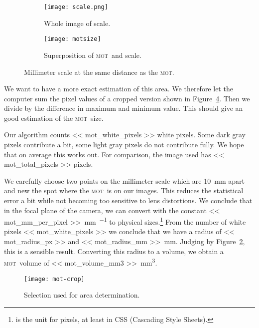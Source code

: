 \documentclass[11pt, english, fleqn, DIV=15, headinclude, BCOR=2cm]{scrreprt}
\newcommand\mot{\textsc{mot}}
\begin{document}
\begin{figure}
    \begin{subfigure}{.45\textwidth}
        \centering
        \texttt{[image: scale.png]}
        \caption{Whole image of scale.}
        \label{fig:scale}
    \end{subfigure}
    \hfill
    \begin{subfigure}{.45\textwidth}
        \centering
        \texttt{[image: motsize]}
        \caption{Superposition of \mot\ and scale.}
        \label{fig:motsize}
    \end{subfigure}
    \caption{Millimeter scale at the same distance as the \mot.}
    \label{fig:mot_size}
\end{figure}

We want to have a more exact estimation of this area. We therefore let the
computer sum the pixel values of a cropped version shown in
Figure~\ref{fig:mot-crop}. Then we divide by the difference in maximum and
minimum value. This should give an good estimation of the \mot\ size.

Our algorithm counts \num{<< mot_white_pixels >>} white pixels. Some dark gray
pixels contribute a bit, some light gray pixels do not contribute fully. We
hope that on average this works out. For comparison, the image used has \num{<<
mot_total_pixels >>} pixels.

We carefully choose two points on the millimeter scale which are
\SI{10}{\milli\meter} apart and new the spot where the \mot\ is on our images.
This reduces the statistical error a bit while not becoming too sensitive to
lens distortions. We conclude that in the focal plane of the camera, we can
convert with the constant \SI{<< mot_mm_per_pixel >>}{\milli\meter\per\pixel}
to physical sizes.\footnote{\si{\pixel} is the unit for pixels, at least in CSS
(Cascading Style Sheets).} From the number of white pixels \num{<<
mot_white_pixels >>} we conclude that we have a radius of \SI{<< mot_radius_px
>>}{\pixel} and \SI{<< mot_radius_mm >>}{\milli\meter}. Judging by
Figure~\ref{fig:motsize}, this is a sensible result. Converting this radius to
a volume, we obtain a \mot\ volume of \SI{<< mot_volume_mm3
>>}{\milli\meter\cubed}.


\begin{figure}
    \centering
    \texttt{[image: mot-crop]}
    \caption{%
        Selection used for area determination.
    }
    \label{fig:mot-crop}
\end{figure}
\end{document}
